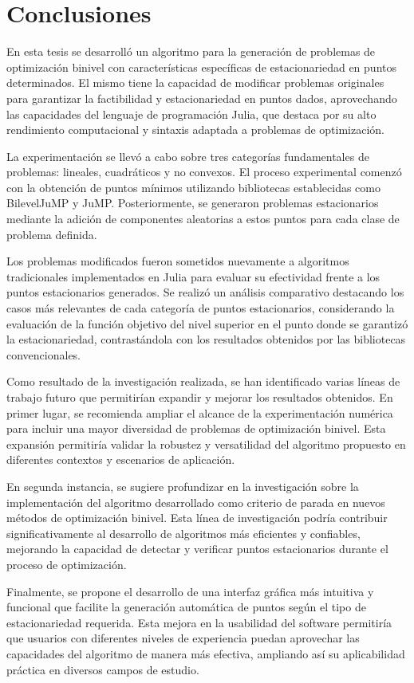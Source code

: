 \chapter{Conclusiones}

En esta tesis se desarrolló un algoritmo para la generación de problemas de optimización binivel con características específicas de estacionariedad en puntos determinados. El mismo tiene la capacidad de modificar problemas originales para garantizar la factibilidad y estacionariedad en puntos dados, aprovechando las capacidades del lenguaje de programación Julia, que destaca por su alto rendimiento computacional y sintaxis adaptada a problemas de optimización.

La experimentación se llevó a cabo sobre tres categorías fundamentales de problemas: lineales, cuadráticos y no convexos. El proceso experimental comenzó con la obtención de puntos mínimos utilizando bibliotecas establecidas como BilevelJuMP y JuMP. Posteriormente, se generaron problemas estacionarios mediante la adición de componentes aleatorias a estos puntos para cada clase de problema definida.

Los problemas modificados fueron sometidos nuevamente a algoritmos tradicionales implementados en Julia para evaluar su efectividad frente a los puntos estacionarios generados. Se realizó un análisis comparativo destacando los casos más relevantes de cada categoría de puntos estacionarios, considerando la evaluación de la función objetivo del nivel superior en el punto donde se garantizó la estacionariedad, contrastándola con los resultados obtenidos por las bibliotecas convencionales.

Como resultado de la investigación realizada, se han identificado varias líneas de trabajo futuro que permitirían expandir y mejorar los resultados obtenidos. En primer lugar, se recomienda ampliar el alcance de la experimentación numérica para incluir una mayor diversidad de problemas de optimización binivel. Esta expansión permitiría validar la robustez y versatilidad del algoritmo propuesto en diferentes contextos y escenarios de aplicación.

En segunda instancia, se sugiere profundizar en la investigación sobre la implementación del algoritmo desarrollado como criterio de parada en nuevos métodos de optimización binivel. Esta línea de investigación podría contribuir significativamente al desarrollo de algoritmos más eficientes y confiables, mejorando la capacidad de detectar y verificar puntos estacionarios durante el proceso de optimización.

Finalmente, se propone el desarrollo de una interfaz gráfica más intuitiva y funcional que facilite la generación automática de puntos según el tipo de estacionariedad requerida. Esta mejora en la usabilidad del software permitiría que usuarios con diferentes niveles de experiencia puedan aprovechar las capacidades del algoritmo de manera más efectiva, ampliando así su aplicabilidad práctica en diversos campos de estudio.